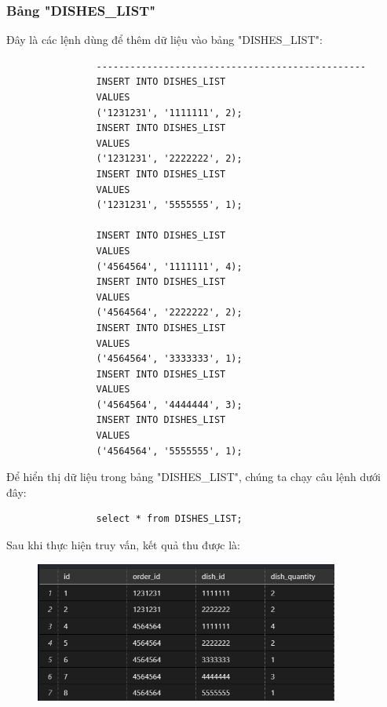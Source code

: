 \documentclass[13pt,a4paper]{article}
\begin{document}
			\subsubsection{Bảng "DISHES\_LIST"}
			Đây là các lệnh dùng để thêm dữ liệu vào bảng "DISHES\_LIST":
			\begin{lstlisting}				
				------------------------------------------------
				INSERT INTO DISHES_LIST
				VALUES
				('1231231', '1111111', 2);
				INSERT INTO DISHES_LIST
				VALUES
				('1231231', '2222222', 2);
				INSERT INTO DISHES_LIST
				VALUES
				('1231231', '5555555', 1);
				
				INSERT INTO DISHES_LIST
				VALUES
				('4564564', '1111111', 4);
				INSERT INTO DISHES_LIST
				VALUES
				('4564564', '2222222', 2);
				INSERT INTO DISHES_LIST
				VALUES
				('4564564', '3333333', 1);
				INSERT INTO DISHES_LIST
				VALUES
				('4564564', '4444444', 3);
				INSERT INTO DISHES_LIST
				VALUES
				('4564564', '5555555', 1);		
			\end{lstlisting}
			Để hiển thị dữ liệu trong bảng "DISHES\_LIST", chúng ta chạy câu lệnh dưới đây:
			\begin{lstlisting}
				select * from DISHES_LIST;
			\end{lstlisting}
			Sau khi thực hiện truy vấn, kết quả thu được là:
			\begin{figure}[h!]
				\begin{center}
					\includegraphics[width=10cm]{vitran/insert_dl.png}
				\end{center}
			\end{figure}
			
\end{document}
